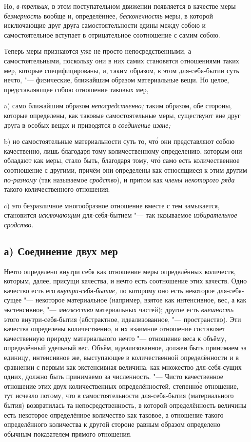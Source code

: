 Но, {\em в-третьих,} в этом поступательном движении появляется в качестве меры
{\em безмерность} вообще и, определённее, {\em бесконечность} меры, в которой
исключающие друг друга самостоятельности едины между собою и самостоятельное
вступает в отрицательное соотношение с самим собою.


Теперь меры признаются уже не просто непосредственными, а самостоятельными,
поскольку они в них самих становятся отношениями таких мер, которые
специфицированы, и, таким образом, в этом для-себя-бытии суть нечто, "---
физические, ближайшим образом материальные вещи. Но целое, представляющее
собою отношение таковых мер,

a) само ближайшим образом {\em непосредственно;} таким образом, обе стороны,
которые определены, как таковые самостоятельные меры, существуют вне друг друга
в особых вещах и приводятся в {\em соединение извне;}

b) но самостоятельные материальности суть то, чт\'{о} они представляют собою
качественно, лишь благодаря тому количественному определению, которым они
обладают как меры, стало быть, благодаря тому, чт\'{о} само есть количественное
соотношение с другими, причём они определены как относящиеся к этим другим
{\em по-разному} (так называемое {\em сродство}), и притом как
{\em члены некоторого ряда} такого количественного отношения;

c) это безразличное многообразное отношение вместе с тем замыкается,
становится {\em исключающим} для-себя-бытием "--- так называемое
{\em избирательное сродство}.

\subsection[а) Соединение двух мер]{а) Соединение двух мер}

Нечто определено внутри себя как отношение меры определённых количеств,
которым, далее, присущи качества, и нечто есть соотношение этих качеств. Одно
качество есть его {\em внутри-себя-бытие,} по которому оно есть некоторое
для-себя-сущее "--- некоторое материальное (например, взятое как интенсивное,
вес, а как экстенсивное, "--- {\em множество} материальных частей); другое есть
{\em внешность} этого внутри-себя-бытия (абстрактное, идеализованное, "---
пространство). Эти качества определены количественно, и их взаимное отношение
составляет качественную природу материального нечто "--- отношение веса к
объёму, определённый удельный вес. Объём, идеализованное, должен быть
принимаем за единицу, интенсивное же, выступающее в количественной
определённости и в сравнении с первым как экстенсивная величина, как множество
для-себя-сущих одних, должно быть принимаемо за численность. "--- Чисто
качественное отношение этих двух количественных определённостей, степенн\'{о}е
отношение, тут исчезло потому, что в самостоятельности для-себя-бытия
(материального бытия) возвратилась та непосредственность, в которой
определённость величины есть некоторое определённое количество как таковое, а
отношение такого определённого количества к другой стороне равным образом
определено обычным показателем прямого отношения.

